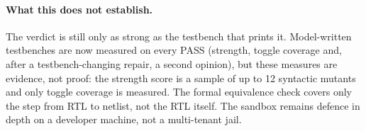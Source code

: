 \paragraph{What this does not establish.} The verdict is still only as strong as the testbench that prints it. Model-written testbenches are now measured on every PASS (strength, toggle coverage and, after a testbench-changing repair, a second opinion), but these measures are evidence, not proof: the strength score is a sample of up to 12 syntactic mutants and only toggle coverage is measured. The formal equivalence check covers only the step from RTL to netlist, not the RTL itself. The sandbox remains defence in depth on a developer machine, not a multi-tenant jail.
